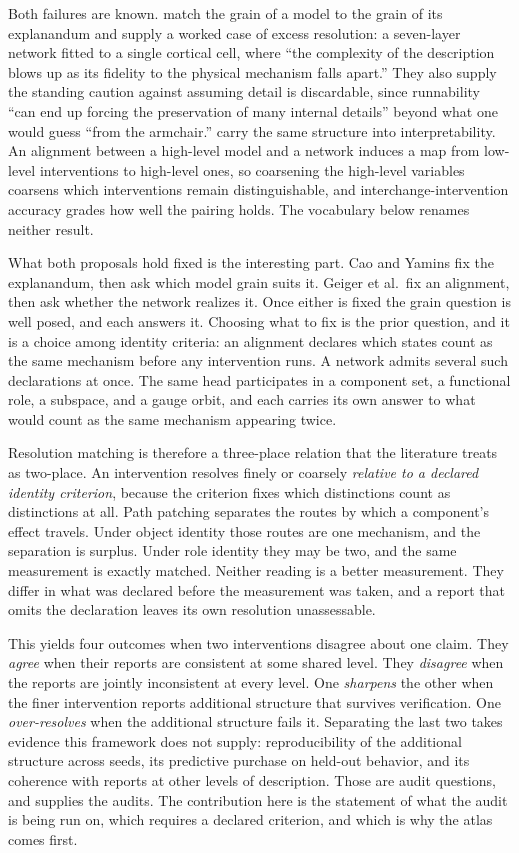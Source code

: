 Both failures are known.  \citet{caoyamins2024a} match the grain of a model to
the grain of its explanandum and supply a worked case of excess resolution: a
seven-layer network fitted to a single cortical cell, where ``the complexity of
the description blows up as its fidelity to the physical mechanism falls
apart.''  They also supply the standing caution against assuming detail is
discardable, since runnability ``can end up forcing the preservation of many
internal details'' beyond what one would guess ``from the armchair.''
\citet{geiger2025} carry the same structure into interpretability.  An alignment
between a high-level model and a network induces a map from low-level
interventions to high-level ones, so coarsening the high-level variables
coarsens which interventions remain distinguishable, and interchange-intervention
accuracy grades how well the pairing holds.  The vocabulary below renames
neither result.

What both proposals hold fixed is the interesting part.  Cao and Yamins fix the
explanandum, then ask which model grain suits it.  Geiger et al.\ fix an
alignment, then ask whether the network realizes it.  Once either is fixed the
grain question is well posed, and each answers it.  Choosing what to fix is the
prior question, and it is a choice among identity criteria: an alignment
declares which states count as the same mechanism before any intervention runs.
A network admits several such declarations at once.  The same head participates
in a component set, a functional role, a subspace, and a gauge orbit, and each
carries its own answer to what would count as the same mechanism appearing
twice.

Resolution matching is therefore a three-place relation that the literature
treats as two-place.  An intervention resolves finely or coarsely
\emph{relative to a declared identity criterion}, because the criterion fixes
which distinctions count as distinctions at all.  Path patching separates the
routes by which a component's effect travels.  Under object identity those
routes are one mechanism, and the separation is surplus.  Under role identity
they may be two, and the same measurement is exactly matched.  Neither reading
is a better measurement.  They differ in what was declared before the
measurement was taken, and a report that omits the declaration leaves its own
resolution unassessable.

This yields four outcomes when two interventions disagree about one claim.  They
\emph{agree} when their reports are consistent at some shared level.  They
\emph{disagree} when the reports are jointly inconsistent at every level.  One
\emph{sharpens} the other when the finer intervention reports additional
structure that survives verification.  One \emph{over-resolves} when the
additional structure fails it.  Separating the last two takes evidence this
framework does not supply: reproducibility of the additional structure across
seeds, its predictive purchase on held-out behavior, and its coherence with
reports at other levels of description.  Those are audit questions, and
\citet{tower2026mechvalidity} supplies the audits.  The contribution here is the
statement of what the audit is being run on, which requires a declared
criterion, and which is why the atlas comes first.
